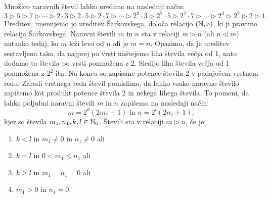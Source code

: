 \documentclass[../TG_magistrsko_delo_sections.tex]{subfiles}
\begin{document}
\begin{definicija}\label{def:ureditev-sark}
Množico naravnih števil lahko uredimo na naslednji način:
$$3 \triangleright 5 \triangleright 7 \triangleright \cdots \triangleright 2\cdot 3 \triangleright 2\cdot 5 \triangleright 2\cdot 7 \triangleright \cdots \triangleright 2^2\cdot 3 \triangleright 2^2\cdot 5 \triangleright 2^2\cdot 7 \triangleright \cdots \triangleright 2^3 \triangleright 2^2 \triangleright 2 \triangleright 1.$$
Ureditev, imenujemo jo ureditev Šarkovskega, določa relacijo $(\mathbb N, \triangleright)$, ki ji pravimo relacija Šarkovskega. Naravni števili $m$ in $n$ sta v relaciji $m\triangleright n$ (ali $n \triangleleft m$) natanko tedaj, ko $m$ leži levo od $n$ ali je $m=n$. Opazimo, da je ureditev sestavljena tako, da najprej po vrsti naštejemo liha števila večja od 1, nato dodamo ta števila po vrsti pomnožena z 2. Sledijo liha števila večja od 1 pomnožena z $2^2$ itn. Na koncu so zapisane potence števila 2 v padajočem vrstnem redu. Zaradi vrstnega reda števil pomislimo, da lahko vsako naravno število zapišemo kot produkt potence števila 2 in nekega lihega števila. To pomeni, da lahko poljubni naravni števili $m$ in $n$ zapišemo na naslednji način: 
\begin{equation}
m= 2^k(2m_1 +1)\text{ in } n= 2^l(2n_1 +1), \label{eq:zapis}
\end{equation}
 kjer so števila $m_1, n_1, k, l \in \mathbb N_0$. Števili sta v relaciji $m \triangleright n$, če je:
\begin{enumerate}[label={(R\arabic*)}]
\item $k<l$ in $m_1 \neq 0$ in $n_1 \neq 0$ ali \label{rel1}
\item $k=l$ in $0<m_1 \leq n_1$ ali \label{rel2}
\item $k \geq l$ in $m_1 = n_1=0$ ali \label{rel3}
\item $m_1>0$ in $n_1 =0$. \label{rel4}
\end{enumerate}
\end{definicija}
\end{document}
